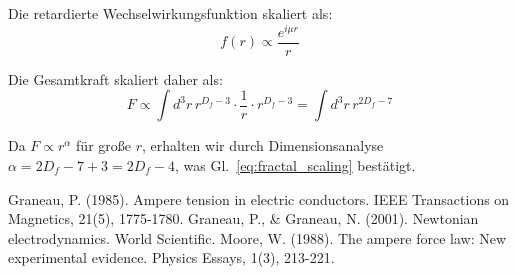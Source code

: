 \documentclass[10pt, a4paper]{article}
\begin{document}
	Die retardierte Wechselwirkungsfunktion skaliert als:
	\begin{equation}
		f(r) \propto \frac{e^{i\mu r}}{r}
	\end{equation}
	
	Die Gesamtkraft skaliert daher als:
	\begin{equation}
		F \propto \int d^3r \, r^{D_f - 3} \cdot \frac{1}{r} \cdot r^{D_f - 3} = \int d^3r \, r^{2D_f - 7}
	\end{equation}
	
	Da $F \propto r^{\alpha}$ für große $r$, erhalten wir durch Dimensionsanalyse $\alpha = 2D_f - 7 + 3 = 2D_f - 4$, was Gl.~\ref{eq:fractal_scaling} bestätigt.
	
	\begin{thebibliography}{9}
		 Graneau, P. (1985). Ampere tension in electric conductors. IEEE Transactions on Magnetics, 21(5), 1775-1780.
		 Graneau, P., \& Graneau, N. (2001). Newtonian electrodynamics. World Scientific.
		 Moore, W. (1988). The ampere force law: New experimental evidence. Physics Essays, 1(3), 213-221.
	\end{thebibliography}
	
\end{document}
